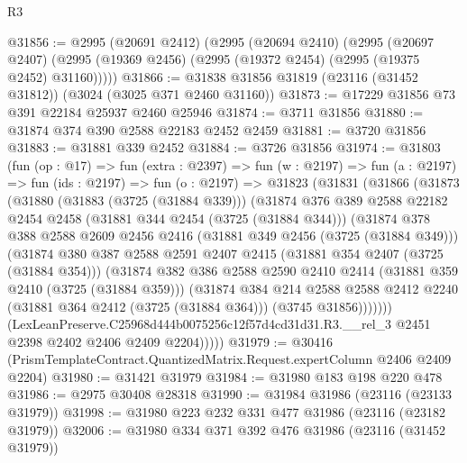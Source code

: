 \begin{lexlean}{R3}
\begin{coremodule}
@31856 := @2995
    (@20691 @2412)
    (@2995
      (@20694 @2410)
      (@2995
        (@20697 @2407)
        (@2995 (@19369 @2456) (@2995 (@19372 @2454) (@2995 (@19375 @2452) @31160)))))
@31866 := @31838 @31856 @31819 (@23116 (@31452 @31812)) (@3024 (@3025 @371 @2460 @31160))
@31873 := @17229 @31856 @73 @391 @22184 @25937 @2460 @25946
@31874 := @3711 @31856
@31880 := @31874 @374 @390 @2588 @22183 @2452 @2459
@31881 := @3720 @31856
@31883 := @31881 @339 @2452
@31884 := @3726 @31856
@31974 := @31803
    (fun (op : @17) =>
    fun (extra : @2397) =>
    fun (w : @2197) =>
    fun (a : @2197) =>
    fun (ids : @2197) =>
    fun (o : @2197) =>
    @31823
      (@31831
        (@31866
          (@31873
            (@31880
              (@31883 (@3725 (@31884 @339)))
              (@31874
                @376
                @389
                @2588
                @22182
                @2454
                @2458
                (@31881 @344 @2454 (@3725 (@31884 @344)))
                (@31874
                  @378
                  @388
                  @2588
                  @2609
                  @2456
                  @2416
                  (@31881 @349 @2456 (@3725 (@31884 @349)))
                  (@31874
                    @380
                    @387
                    @2588
                    @2591
                    @2407
                    @2415
                    (@31881 @354 @2407 (@3725 (@31884 @354)))
                    (@31874
                      @382
                      @386
                      @2588
                      @2590
                      @2410
                      @2414
                      (@31881 @359 @2410 (@3725 (@31884 @359)))
                      (@31874
                        @384
                        @214
                        @2588
                        @2588
                        @2412
                        @2240
                        (@31881 @364 @2412 (@3725 (@31884 @364)))
                        (@3745 @31856)))))))
            (LexLeanPreserve.C25968d444b0075256c12f57d4cd31d31.R3.__rel_3
              @2451
              @2398
              @2402
              @2406
              @2409
              @2204)))))
@31979 := @30416 (PrismTemplateContract.QuantizedMatrix.Request.expertColumn @2406 @2409 @2204)
@31980 := @31421 @31979
@31984 := @31980 @183 @198 @220 @478
@31986 := @2975 @30408 @28318
@31990 := @31984 @31986 (@23116 (@23133 @31979))
@31998 := @31980 @223 @232 @331 @477 @31986 (@23116 (@23182 @31979))
@32006 := @31980 @334 @371 @392 @476 @31986 (@23116 (@31452 @31979))

\end{coremodule}
\end{lexlean}
